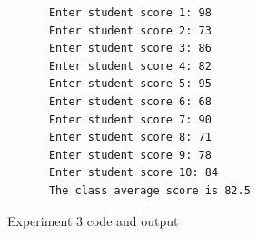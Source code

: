 \documentclass[12pt,titlepage]{article}
\begin{document}
\begin{enumerate}
{        \begin{verbatim}
            Enter student score 1: 98
            Enter student score 2: 73
            Enter student score 3: 86
            Enter student score 4: 82
            Enter student score 5: 95
            Enter student score 6: 68
            Enter student score 7: 90
            Enter student score 8: 71
            Enter student score 9: 78
            Enter student score 10: 84
            The class average score is 82.5
        \end{verbatim}

        \begin{figure}[h]
            \centering
            \caption{Experiment 3 code and output}
        \end{figure}
    }
\end{enumerate}
\end{document}
